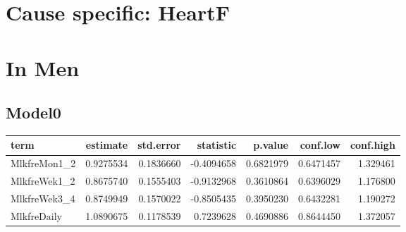\documentclass[
]{article}
\newenvironment{Shaded}{\begin{snugshade}}{\end{snugshade}}
\newcommand{\CommentTok}[1]{\textcolor[rgb]{0.56,0.35,0.01}{\textit{#1}}}
\newcommand{\DataTypeTok}[1]{\textcolor[rgb]{0.13,0.29,0.53}{#1}}
\newcommand{\KeywordTok}[1]{\textcolor[rgb]{0.13,0.29,0.53}{\textbf{#1}}}
\newcommand{\NormalTok}[1]{#1}
\newcommand{\OperatorTok}[1]{\textcolor[rgb]{0.81,0.36,0.00}{\textbf{#1}}}
\newcommand{\OtherTok}[1]{\textcolor[rgb]{0.56,0.35,0.01}{#1}}
\newcommand{\StringTok}[1]{\textcolor[rgb]{0.31,0.60,0.02}{#1}}
\begin{document}
\hypertarget{cause-specific-heartf}{%
\section{Cause specific: HeartF}\label{cause-specific-heartf}}

\begin{Shaded}
\end{Shaded}

\hypertarget{in-men-4}{%
\section{In Men}\label{in-men-4}}

\hypertarget{model0-9}{%
\subsection{Model0}\label{model0-9}}

\begin{Shaded}
\end{Shaded}

\begin{longtable}[]{@{}lrrrrrr@{}}
\toprule
term & estimate & std.error & statistic & p.value & conf.low &
conf.high\tabularnewline
\midrule
\endhead
MlkfreMon1\_2 & 0.9275534 & 0.1836660 & -0.4094658 & 0.6821979 &
0.6471457 & 1.329461\tabularnewline
MlkfreWek1\_2 & 0.8675740 & 0.1555403 & -0.9132968 & 0.3610864 &
0.6396029 & 1.176800\tabularnewline
MlkfreWek3\_4 & 0.8749949 & 0.1570022 & -0.8505435 & 0.3950230 &
0.6432281 & 1.190272\tabularnewline
MlkfreDaily & 1.0890675 & 0.1178539 & 0.7239628 & 0.4690886 & 0.8644450
& 1.372057\tabularnewline
\bottomrule
\end{longtable}
\end{document}
